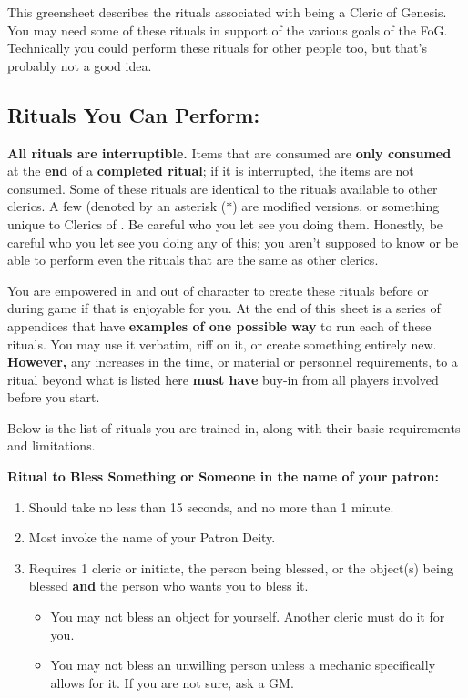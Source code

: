 \documentclass[green]{GL2020}
\begin{document}
\name{\gFoGCleric{}}

This greensheet describes the rituals associated with being a Cleric of Genesis. You may need some of these rituals in support of the various goals of the FoG. Technically you could perform these rituals for other people too, but that's probably not a good idea.

\subsection*{Rituals You Can Perform:}
\textbf{All rituals are interruptible.} Items that are consumed are \textbf{only consumed }at the \textbf{end} of a \textbf{completed ritual}; if it is interrupted, the items are not consumed. Some of these rituals are identical to the rituals available to other clerics. A few (denoted by an asterisk ($*$) are modified versions, or something unique to Clerics of \cGenesis{}. Be careful who you let see you doing them. Honestly, be careful who you let see you doing any of this; you aren't supposed to know or be able to perform even the rituals that are the same as other clerics.

You are empowered in and out of character to create these rituals before or during game if that is enjoyable for you. At the end of this sheet is a series of appendices that have \textbf{examples of one possible way} to run each of these rituals. You may use it verbatim, riff on it, or create something entirely new. \textbf{However,} any increases in the time, or material or personnel requirements, to a ritual beyond what is listed here \textbf{must have} buy-in from all players involved before you start.

Below is the list of rituals you are trained in, along with their basic requirements and limitations.

\textbf{Ritual to Bless Something or Someone in the name of your patron:}
  \begin{enumerate}
    \item Should take no less than 15 seconds, and no more than 1 minute.
    \item Most invoke the name of your Patron Deity.
    \item Requires 1 cleric or initiate, the person being blessed, or the object(s) being blessed \textbf{and} the person who wants you to bless it. 
    \begin{itemize}
      \item You may not bless an object for yourself. Another cleric must do it for you.
      \item You may not bless an unwilling person unless a mechanic specifically allows for it. If you are not sure, ask a GM.
    \end{itemize}
  \end{enumerate}
\end{document}
